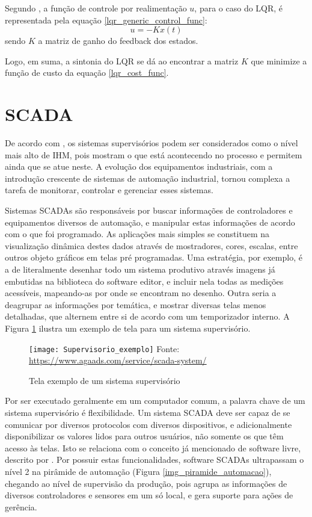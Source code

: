 Segundo \cite{argentim2013}, a função de controle por realimentação $u$, para o caso do LQR, é representada pela equação \ref{lqr_generic_control_func}:
\begin{equation}
u = -Kx(t)
\label{lqr_generic_control_func}
\end{equation}
sendo $K$ a matriz de ganho do feedback dos estados.

Logo, em suma, a sintonia do LQR se dá ao encontrar a matriz $K$ que minimize a função de custo da equação \ref{lqr_cost_func}.

\section{SCADA}

De acordo com , os sistemas supervisórios podem ser considerados como o nível mais alto de IHM, pois mostram o que está acontecendo no processo e permitem ainda que se atue neste. A evolução dos equipamentos industriais, com a introdução crescente de sistemas de automação industrial, tornou complexa a tarefa de monitorar, controlar e gerenciar esses sistemas. 

Sistemas SCADAs são responsáveis por buscar informações de controladores e equipamentos diversos de automação, e manipular estas informações de acordo com o que foi programado. As aplicações mais simples se constituem na visualização dinâmica destes dados através de mostradores, cores, escalas, entre outros objeto gráficos em telas pré programadas. Uma estratégia, por exemplo, é a de literalmente desenhar todo um sistema produtivo através imagens já embutidas na biblioteca do software editor, e incluir nela todas as medições acessíveis, mapeando-as por onde se encontram no desenho. Outra seria a deagrupar as informações por temática, e mostrar diversas telas menos detalhadas, que alternem entre si de acordo com um temporizador interno. A Figura \ref{img_supervisorio_exemplo} ilustra um exemplo de tela para um sistema supervisório.

\begin{figure}[hbt]
	\centering
	\caption{Tela exemplo de um sistema supervisório}
	\texttt{[image: Supervisorio\_exemplo]}
	Fonte: \href{https://www.agaads.com/service/scada-system/}{https://www.agaads.com/service/scada-system/}
	\label{img_supervisorio_exemplo}
\end{figure}

Por ser executado geralmente em um computador comum, a palavra chave de um sistema supervisório é flexibilidade. Um sistema SCADA deve ser capaz de se comunicar por diversos protocolos com diversos dispositivos, e adicionalmente disponibilizar os valores lidos para outros usuários, não somente os que têm acesso às telas. Isto se relaciona com o conceito já mencionado de software livre, descrito por . Por possuir estas funcionalidades, software SCADAs ultrapassam o nível 2 na pirâmide de automação (Figura \ref{img_piramide_automacao}), chegando ao nível de supervisão da produção, pois agrupa as informações de diversos controladores e sensores em um só local, e gera suporte para ações de gerência.

